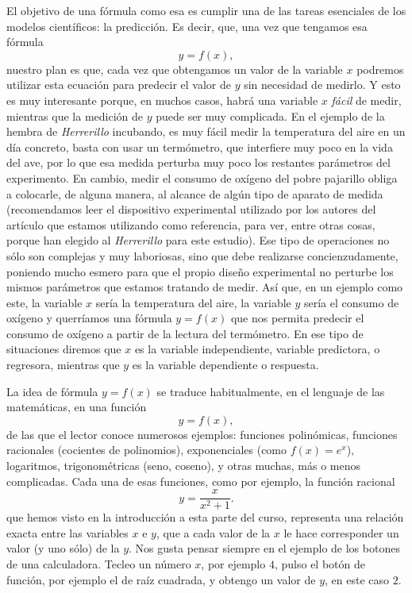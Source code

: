 El objetivo de una fórmula como esa es cumplir una de las tareas esenciales de los modelos
científicos: la {\sf predicción}.  Es decir, que, una vez que tengamos esa fórmula
    \[y=f(x),\]
nuestro plan es que, cada vez que obtengamos un valor de la variable $x$ podremos utilizar esta
ecuación para {\sf predecir el valor de $y$ sin necesidad de medirlo}. Y esto es muy interesante
porque, en muchos  casos, habrá una variable $x$ {\em fácil} de medir, mientras que la medición de
$y$ puede ser muy complicada. En el ejemplo de la hembra de {\em Herrerillo} incubando, es muy fácil medir la temperatura del aire en un día concreto, basta con usar un termómetro, que interfiere muy poco en la vida del ave, por lo que esa medida perturba muy poco los restantes parámetros del experimento. En cambio, medir el consumo de oxígeno del pobre pajarillo obliga a colocarle, de alguna manera, al alcance de algún tipo de aparato de medida (recomendamos leer el dispositivo experimental utilizado por los autores del artículo que estamos utilizando como referencia, para ver, entre otras cosas, porque han elegido al {\em Herrerillo} para este estudio). Ese tipo de operaciones no sólo son complejas y muy laboriosas, sino que debe realizarse concienzudamente, poniendo mucho esmero para que el propio diseño  experimental no perturbe los mismos parámetros que estamos tratando de medir. Así que, en un ejemplo como este, la variable $x$ sería la temperatura del aire, la variable $y$ sería el consumo de oxígeno y querríamos una fórmula $y=f(x)$ que nos permita predecir el consumo de oxígeno a partir de la lectura del termómetro. En ese tipo de situaciones diremos que $x$ es la {\sf variable independiente}, {\sf variable predictora}, o {\sf regresora}, mientras que $y$ es la {\sf variable dependiente} o {\sf respuesta}.

La idea de fórmula $y=f(x)$ se traduce habitualmente, en el lenguaje de las matemáticas, en una función
\[y=f(x),\]
de las que el lector conoce numerosos ejemplos: funciones polinómicas, funciones
racionales (cocientes de polinomios), exponenciales (como $f(x)=e^x$), logaritmos, trigonométricas
(seno, coseno), y otras muchas, más o menos complicadas. Cada una de esas funciones, como por
ejemplo, la función racional
    \[y=\frac{x}{x^2+1}.\]
que hemos visto en la introducción a esta parte del curso, representa una relación exacta entre las variables $x$ e $y$, que a cada valor de la $x$ le hace corresponder un valor (y uno sólo) de la $y$. Nos gusta pensar siempre en el ejemplo de los botones de una calculadora. Tecleo un número $x$, por ejemplo $4$, pulso el botón de función, por ejemplo el de raíz cuadrada, y obtengo un valor de $y$, en este caso $2$.

